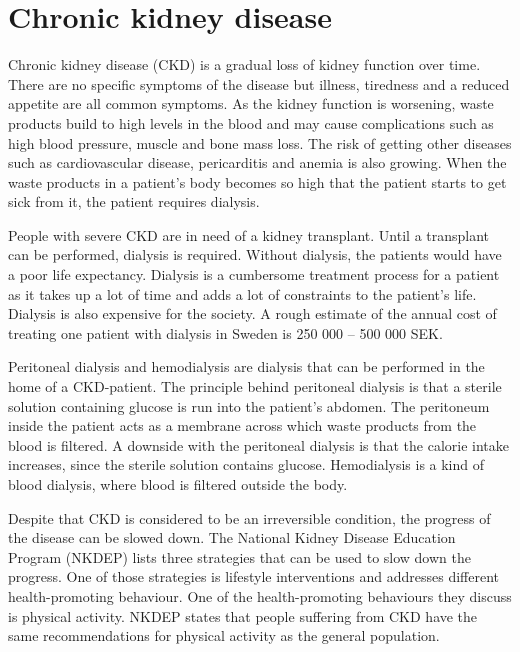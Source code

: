 \documentclass{cslthse-msc}
\begin{document}
\section{Chronic kidney disease}
\label{sec:kiney}

Chronic kidney disease (CKD) is a gradual loss of kidney function over time\cite{KIDNEYFOUNDATION}. There are no specific symptoms of the disease but illness, tiredness and a reduced appetite are all common symptoms. As the kidney function is worsening, waste products build to high levels in the blood and may cause complications such as high blood pressure,  muscle and bone mass loss. The risk of getting other diseases such as cardiovascular disease, pericarditis and anemia is also growing.  When the waste products in a patient’s body becomes so high that the patient starts to get sick from it, the patient requires dialysis\cite{KIDNEYFOUNDATION}.%

People with severe CKD are in need of a kidney transplant. Until a transplant can be performed, dialysis is required. Without dialysis, the patients would have a poor life expectancy\cite{KIDNEYFOUNDATION}. Dialysis is a cumbersome treatment process for a patient as it takes up a lot of time and adds a lot of constraints to the patient’s life. Dialysis is also expensive for the society. A rough estimate of the annual cost of treating one patient with dialysis in Sweden is 250 000 – 500 000 SEK. \cite{sr}

Peritoneal dialysis and hemodialysis are dialysis that can be performed in the home of a CKD-patient. The principle behind peritoneal dialysis is that a sterile solution containing glucose is run into the patient’s abdomen\cite{DIALYSIS}. The peritoneum inside the patient acts as a membrane across which waste products from the blood is filtered. A downside with the peritoneal dialysis is that the calorie intake increases, since the sterile solution contains glucose. Hemodialysis is a kind of blood dialysis, where blood is filtered outside the body.

Despite that CKD is considered to be an irreversible condition, the progress of the disease can be slowed down. The National Kidney Disease Education Program (NKDEP) lists three strategies that can be used to slow down the progress\cite{NKDEPPROG}. One of those strategies is lifestyle interventions and addresses different health-promoting behaviour. One of the health-promoting behaviours they discuss is physical activity. NKDEP states that people suffering from CKD have the same recommendations for physical activity as the general population. 
\end{document}
